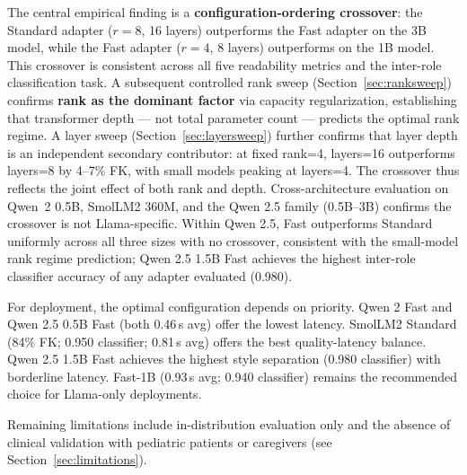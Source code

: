 \documentclass[journal]{IEEEtai}
\begin{document}
The central empirical finding is a \textbf{configuration-ordering crossover}: the Standard adapter ($r = 8$, 16 layers) outperforms the Fast adapter on the 3B model, while the Fast adapter ($r = 4$, 8 layers) outperforms on the 1B model. This crossover is consistent across all five readability metrics and the inter-role classification task. A subsequent controlled rank sweep (Section~\ref{sec:ranksweep}) confirms \textbf{rank as the dominant factor} via capacity regularization, establishing that transformer depth --- not total parameter count --- predicts the optimal rank regime. A layer sweep (Section~\ref{sec:layersweep}) further confirms that layer depth is an independent secondary contributor: at fixed rank=4, layers=16 outperforms layers=8 by 4--7\% FK, with small models peaking at layers=4. The crossover thus reflects the joint effect of both rank and depth. Cross-architecture evaluation on Qwen~2 0.5B, SmolLM2 360M, and the Qwen 2.5 family (0.5B--3B) confirms the crossover is not Llama-specific. Within Qwen 2.5, Fast outperforms Standard uniformly across all three sizes with no crossover, consistent with the small-model rank regime prediction; Qwen 2.5 1.5B Fast achieves the highest inter-role classifier accuracy of any adapter evaluated (0.980).

For deployment, the optimal configuration depends on priority. Qwen 2 Fast and Qwen 2.5 0.5B Fast (both 0.46\,s avg) offer the lowest latency. SmolLM2 Standard (84\% FK; 0.950 classifier; 0.81\,s avg) offers the best quality-latency balance. Qwen 2.5 1.5B Fast achieves the highest style separation (0.980 classifier) with borderline latency. Fast-1B (0.93\,s avg; 0.940 classifier) remains the recommended choice for Llama-only deployments.

Remaining limitations include in-distribution evaluation only and the absence of clinical validation with pediatric patients or caregivers (see Section~\ref{sec:limitations}).
\end{document}
